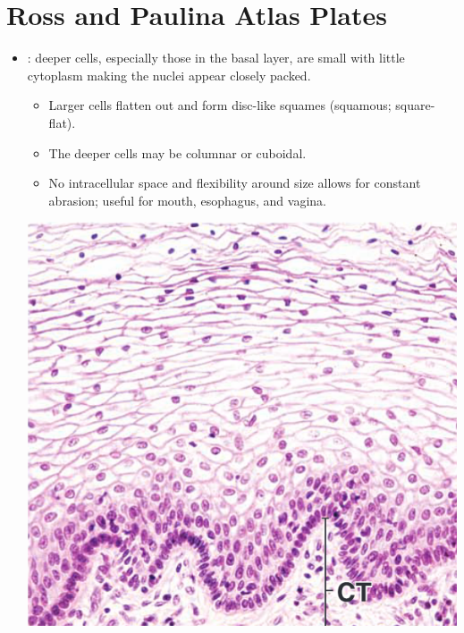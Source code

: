 \section{Ross and Paulina Atlas Plates}\label{Ross and Paulina Atlas Plates}
\begin{itemize}
  \item {}: deeper cells, especially those in the basal layer, are small with little cytoplasm making the nuclei appear closely packed.
    \begin{itemize}
      \item Larger cells flatten out and form disc-like squames (squamous; square-flat).
      \item The deeper cells may be columnar or cuboidal.
      \item No intracellular space and flexibility around size allows for constant abrasion; useful for mouth, esophagus, and vagina. 
    \end{itemize}
  \begin{center}
    \includegraphics[scale=0.375]{images/week-1-rp1.png}

\end{center}
\end{itemize}
